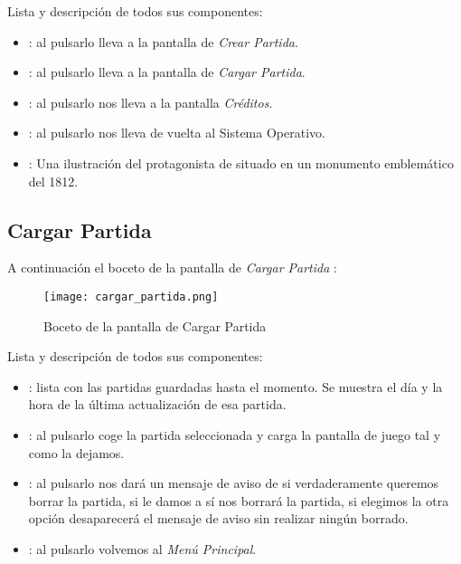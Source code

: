             Lista y descripción de todos sus componentes:
            \begin{itemize}
            \item {}: al pulsarlo lleva a la pantalla de \emph{Crear Partida}.
            \item {}: al pulsarlo lleva a la pantalla de \emph{Cargar Partida}.
            \item {}: al pulsarlo nos lleva a la pantalla \emph{Créditos}.
            \item {}: al pulsarlo nos lleva de vuelta al Sistema Operativo.
            \item {}: Una ilustración del protagonista de \nombrejuego situado en un monumento emblemático del 1812.
            \end{itemize}
            
            \newpage
            \subsection{Cargar Partida}
            A continuación el boceto de la pantalla de \emph{Cargar Partida} :
            
            \begin{figure}[H] 
                \begin{center}
                    \texttt{[image: cargar\_partida.png]}
                \end{center}
                \caption{Boceto de la pantalla de Cargar Partida}
                \label{fig:cargar-partida}
            \end{figure}
            
            Lista y descripción de todos sus componentes:
            \begin{itemize}
            \item {}: lista con las partidas guardadas hasta el momento. Se muestra el día y la hora de la última actualización de esa partida.
            \item {}: al pulsarlo coge la partida seleccionada y carga la pantalla de juego tal y como la dejamos.
            \item {}: al pulsarlo nos dará un mensaje de aviso de si verdaderamente queremos borrar la partida, si le damos a sí nos borrará la partida, si elegimos la otra opción desaparecerá el mensaje de aviso sin realizar ningún borrado.
            \item {}: al pulsarlo volvemos al \emph{Menú Principal}.
            \end{itemize}
            
